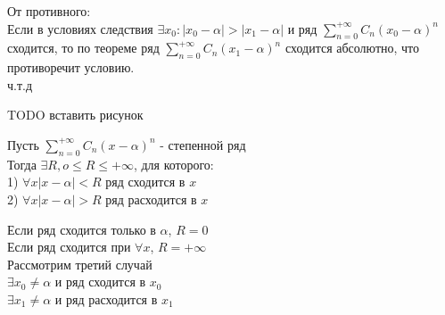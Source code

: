 \begin{Proof}
	От противного:\\
	Если в условиях следствия $\exists x_0 : |x_0 - \alpha| > |x_1 - \alpha|$ и ряд $\sum^{+\infty}_{n=0} C_n(x_0-\alpha)^n$ сходится, то по теореме ряд $\sum^{+\infty}_{n=0} C_n(x_1-\alpha)^n$ сходится абсолютно, что противоречит условию.\\
	ч.т.д\\
\end{Proof}

\begin{Note}
	TODO вставить рисунок
\end{Note}

\begin{Th}
	Пусть $\sum^{+\infty}_{n=0} C_n(x-\alpha)^n$ - степенной ряд\\
	Тогда $\exists R, o \leq R \leq +\infty$, для которого:\\
	1) $\forall x |x-\alpha| < R$ ряд сходится в $x$\\
	2) $\forall x |x-\alpha| > R$ ряд расходится в $x$\\ 
\end{Th}

\begin{Proof}
	Если ряд сходится только в $\alpha$, $R = 0$\\
	Если ряд сходится при $\forall x$, $R = +\infty$\\
	Рассмотрим третий случай\\
	$\exists x_0 \neq \alpha$ и ряд сходится в $x_0$\\
	$\exists x_1 \neq \alpha$ и ряд расходится в $x_1$\\
\end{Proof}